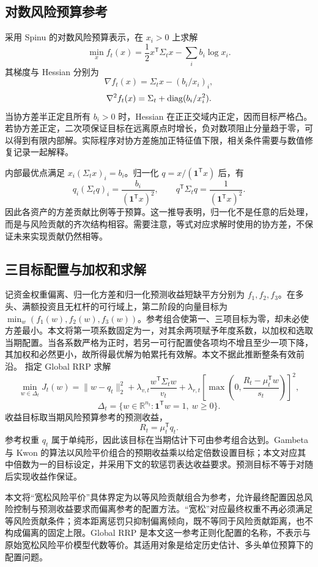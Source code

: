 \subsection{对数风险预算参考}
采用 Spinu 的对数风险预算表示\cite{spinu2013algorithm}，在 $x_i>0$ 上求解
\[
\min_x f_t(x)=\frac12x^\mathsf T\Sigma_t x-\sum_i b_i\log x_i.
\]
其梯度与 Hessian 分别为
\[
\nabla f_t(x)=\Sigma_t x-(b_i/x_i)_i,
\]
\[
\nabla^2 f_t(x)=\Sigma_t+\mathop{\rm diag}(b_i/x_i^2).
\]
当协方差半正定且所有 $b_i>0$ 时，Hessian 在正正交域内正定，因而目标严格凸。若协方差正定，二次项保证目标在远离原点时增长，负对数项阻止分量趋于零，可以得到有限内部解。实际程序对协方差施加正特征值下限，相关条件需要与数值修复记录一起解释。

内部最优点满足 $x_i(\Sigma_t x)_i=b_i$。归一化 $q=x/(\mathbf1^\mathsf T x)$ 后，有
\[
q_i(\Sigma_t q)_i=\frac{b_i}{(\mathbf1^\mathsf T x)^2},\qquad
q^\mathsf T\Sigma_t q=\frac{1}{(\mathbf1^\mathsf T x)^2}.
\]
因此各资产的方差贡献比例等于预算。这一推导表明，归一化不是任意的后处理，而是与风险贡献的齐次结构相容。需要注意，等式对应求解时使用的协方差，不保证未来实现贡献仍然相等。

\subsection{三目标配置与加权和求解}
记资金权重偏离、归一化方差和归一化预测收益短缺平方分别为 $f_1,f_2,f_3$。在多头、满额投资且无杠杆的可行域上，第二阶段的向量目标为 $\min_w(f_1(w),f_2(w),f_3(w))$。参考组合使第一、三项目标为零，却未必使方差最小。本文将第一项系数固定为一，对其余两项赋予年度系数，以加权和选取当期配置。当各系数严格为正时，若另一可行配置使各项均不增且至少一项下降，其加权和必然更小，故所得最优解为帕累托有效解。本文不据此推断整条有效前沿。
指定 Global RRP 求解
\[
\min_{w\in\Delta_t}J_t(w)
=\|w-q_t\|_2^2
+\lambda_{v,t}\frac{w^\mathsf T\Sigma_t w}{v_t}
+\lambda_{r,t}\left[\max\left(0,\frac{R_t-\mu_t^\mathsf T w}{s_t}\right)\right]^2,
\]
\[
\Delta_t=\{w\in\mathbb R^{n_t}:\mathbf1^\mathsf T w=1,\ w\geq0\}.
\]
收益目标取当期风险预算参考的预测收益，
\[
R_t=\mu_t^\mathsf Tq_t.
\]
参考权重 $q_t$ 属于单纯形，因此该目标在当期估计下可由参考组合达到。Gambeta 与 Kwon 的算法以风险平价组合的预期收益乘以给定倍数设置目标\cite{gambeta2020risk}；本文对应其中倍数为一的目标设定，并采用下文的软惩罚表达收益要求。预测目标不等于对随后实现收益作保证。

本文将“宽松风险平价”具体界定为以等风险贡献组合为参考，允许最终配置因总风险控制与预测收益要求而偏离参考的配置方法。“宽松”对应最终权重不再必须满足等风险贡献条件；资本距离惩罚只抑制偏离倾向，既不等同于风险贡献距离，也不构成偏离的固定上限。Global RRP 是本文这一参考正则化配置的名称，不表示与原始宽松风险平价模型代数等价。其适用对象是给定历史估计、多头单位预算下的配置问题。

